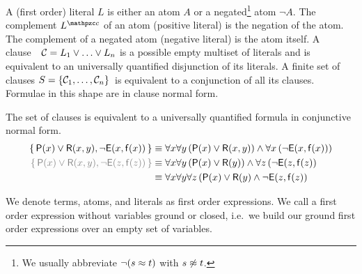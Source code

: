 
\begin{definition}[\CNF]\label{def:literals}\label{def:CNF}
A (first order) {\myem literal} $L$ is either an atom $A$ or a negated\footnote{
We usually abbreviate $\lnot(s\approx t)$ with $s\not\approx t$.
} 
atom $\lnot A$.
%
The {\myem complement} $L^\mcc$ of an atom (positive literal) is the negation of the atom.
The complement of a negated atom (negative literal) is the atom itself. 
%
A {\myem clause}\ \ ${\mathcal C} = L_1\lor\ldots\lor L_n$  is a possible empty multiset of literals 
and is equivalent to an universally quantified disjunction of its literals.
%
A finite {\myem set of clauses} $S=\{ {\mathcal C}_1,\ldots,{\mathcal C}_n \}$ is equivalent to a conjunction of all its clauses.
%
Formulae in this shape are in {\myem clause normal form}.
\end{definition}

\begin{example}The set of clauses is equivalent to a universally quantified formula in conjunctive normal form.
	\begin{align*}
		\{\, \mP(x)\lor\mR(x,y), \lnot \mE(x,\mf(x)) \, \}
		&\equiv
		\forall x \forall y\, (\mP(x)\lor\mR(x,y))
		\land
		\forall x\, (\lnot \mE(x,\mf(x))) 
		\\
		{\colG
			\{\, \mP(x)\lor\mR(x,y), \lnot \mE(z,\mf(z)) \, \}}
		&\equiv
		\forall x \forall y\, (\mP(x)\lor\mR(y))
		\land
		\forall z\,(\lnot \mE(z,\mf(z)) 
		\\
		&\equiv
		\forall x \forall y\forall z\, 
		(\mP(x)\lor\mR(y)\land \lnot \mE(z,\mf(z))
	\end{align*}
\end{example}

\begin{definition}
	We denote
	terms, atoms, and literals as first order expressions.
	We call a first order expression without variables {\myem ground} or {\myem closed}, 
	i.e.~we build our ground first order expressions over an empty set of variables.
\end{definition}


